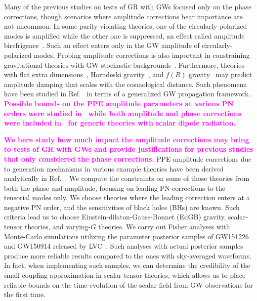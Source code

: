 \documentclass[prd,twocolumn,nofootinbib]{revtex4-1}
\newcommand{\kent}[1]{\textcolor{magenta}{\textbf{#1}} }
\begin{document}
Many of the previous studies on tests of GR with GWs focused only on the phase corrections, though scenarios where amplitude corrections bear importance  are not uncommon. In some parity-violating theories, one of the circularly-polarized modes is amplified while the other one is suppressed, an effect called amplitude birefrigence~\cite{Alexander:2007kv,Yunes:2008bu,Yunes:2010yf,Yagi:2017zhb}. Such an effect enters only in the GW amplitude of circularly-polarized modes. Probing amplitude corrections is also important in constraining gravitational theories with GW stochastic backgrounds~\cite{Maselli:2016ekw}. Furthermore, theories with flat extra dimensions~\cite{Cardoso:2002pa}, Horndeski gravity~\cite{Saltas:2014dha}, and $f(R)$ gravity~\cite{Hwang:1996xh} may predict amplitude damping that scales with the cosmological distance. Such phenomena have been studied in Ref.~\cite{Nishizawa:2017nef}  in terms of a generalized GW propagation framework. \kent{Possible bounds on the PPE amplitude parameters at various PN orders were studied in~\cite{Cornish:2011ys} while both amplitude and phase corrections were included in~\cite{Arun:2012hf} for generic theories with scalar dipole radiation.}



\kent{We here study how much impact the amplitude corrections may bring to tests of GR with GWs and provide justifications for previous studies that only considered the phase corrections.}
PPE amplitude corrections due to generation mechanisms in various example theories have been derived analytically in Ref.~\cite{Tahura:2018zuq}. We compute the constraints on some of those theories from both the phase and amplitude, focusing on leading PN corrections to the tensorial modes only. We choose theories where the leading correction enters at a negative PN order, and the sensitivities of black holes (BHs) are known. Such criteria lead us to choose Einstein-dilaton-Gauss-Bonnet (EdGB) gravity, scalar-tensor theories, and varying-$G$ theories. We carry out Fisher analyses with Monte-Carlo simulations utilizing the parameter posterior samples of GW151226 and GW150914 released by LVC~\cite{ligo:sample}. Such analyses with actual posterior samples produce more reliable results compared to the ones with sky-averaged waveforms. In fact, when implementing such samples, we can determine the credibility of the small coupling approximation in scalar-tensor theories, which allows us to place reliable bounds on the time-evolution of the scalar field from GW observations for the first time.
\end{document}
